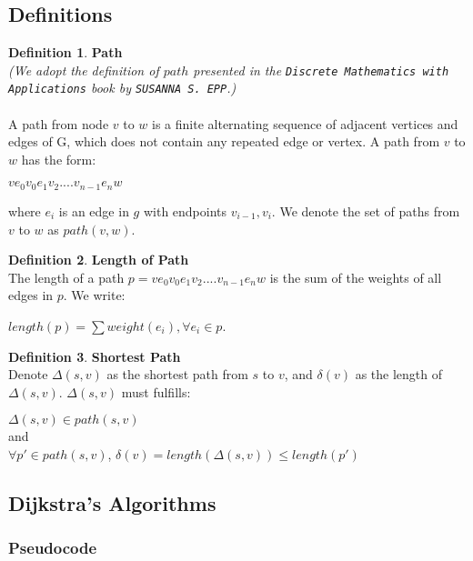 \documentclass[11pt, a4paper]{article} %
\theoremstyle{definition}
\newtheorem{definition}{Definition}[section]
\begin{document}
\subsection{Definitions}
\theoremstyle{definition}
\begin{definition}\textbf{Path}\\
\textit{(We adopt the definition of $path$ presented in the \texttt{Discrete Mathematics with Applications} book by \texttt{SUSANNA S. EPP}.)}
\\\\
A path from node $v$ to $w$ is a finite alternating sequence of adjacent vertices and edges of G, which does not contain any repeated edge or vertex. A path from $v$ to $w$ has the form: 
\begin{center}
 $ve_0v_0e_1v_2....v_{n-1}e_nw$ 
\end{center}
where $e_i$ is an edge in $g$ with endpoints $v_{i-1}, v_i$. We denote the set of paths from $v$ to $w$ as $path(v, w)$.
\end{definition}
\begin{definition}\textbf{Length of Path} \\
The length of a path $p = ve_0v_0e_1v_2....v_{n-1}e_nw$ is the sum of the weights of all edges in $p$. We write: 
\begin{center}
  $length(p) = \sum weight(e_i), \forall e_i \in p$. 
\end{center} 
\end{definition}
\begin{definition}\textbf{Shortest Path}\\
Denote $\Delta(s, v)$ as the shortest path from $s$ to $v$, and $\delta(v)$ as the length of $\Delta(s, v)$. $\Delta(s, v)$ must fulfills: 
\begin{center}
$\Delta(s, v) \in path(s, v)$ 
\\
and 
\\
$\forall p' \in path(s, v)$, $\delta(v) = length(\Delta(s, v)) \leq length(p')$
\end{center}
\end{definition}

\subsection{Dijkstra's Algorithms}
\subsubsection{Pseudocode}
\end{document}
